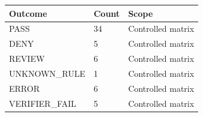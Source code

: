 \begin{tabularx}{\linewidth}{@{}XXX@{}}
\toprule
Outcome & Count & Scope \\
\midrule
PASS & 34 & Controlled matrix \\
DENY & 5 & Controlled matrix \\
REVIEW & 6 & Controlled matrix \\
UNKNOWN\_RULE & 1 & Controlled matrix \\
ERROR & 6 & Controlled matrix \\
VERIFIER\_FAIL & 5 & Controlled matrix \\
\bottomrule
\end{tabularx}
